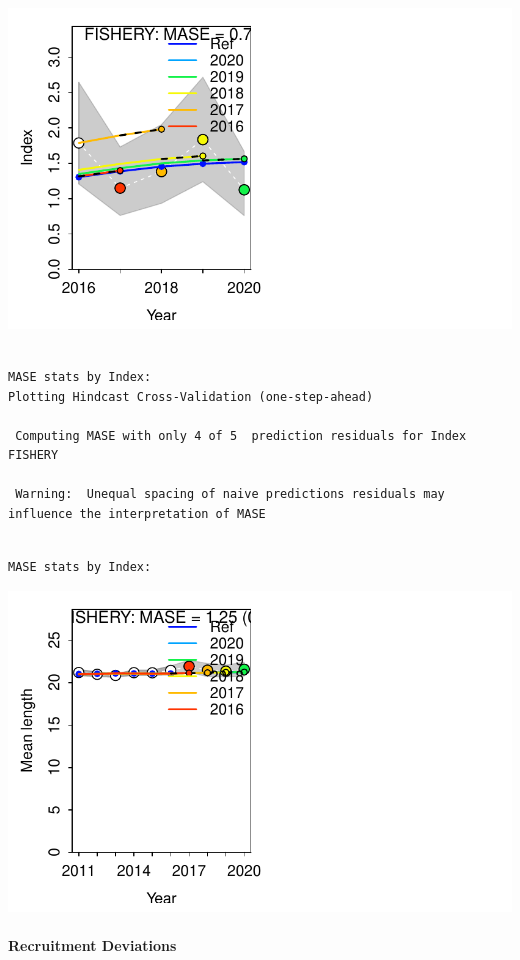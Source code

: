 \documentclass[
  letterpaper,
  DIV=11,
  numbers=noendperiod]{scrartcl}
\let\oldparagraph\paragraph
\renewcommand{\paragraph}[1]{\oldparagraph{#1}\mbox{}}
\begin{document}
\includegraphics{LUKA_50_Base_model_diags_report_files/figure-pdf/hindcast-1.pdf}

\begin{verbatim}

MASE stats by Index:
Plotting Hindcast Cross-Validation (one-step-ahead) 

 Computing MASE with only 4 of 5  prediction residuals for Index FISHERY 

 Warning:  Unequal spacing of naive predictions residuals may influence the interpretation of MASE 
\end{verbatim}

\begin{verbatim}

MASE stats by Index:
\end{verbatim}

\includegraphics{LUKA_50_Base_model_diags_report_files/figure-pdf/hindcast-2.pdf}

\hypertarget{recruitment-deviations}{%
\paragraph{Recruitment Deviations}\label{recruitment-deviations}}
\end{document}
